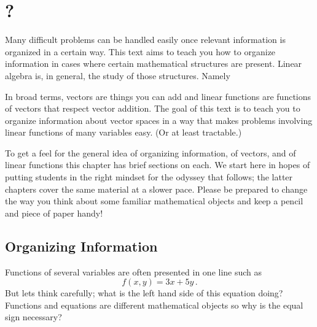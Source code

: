\chapter{\whatIsTitle?}\label{warmup}


Many difficult problems can be handled easily 
once  relevant information is organized in a certain way. 
This text aims to teach you how to organize information in cases where certain mathematical structures are present. 
Linear algebra is, in general, the study of those structures. Namely

\vspace{3mm}
\vspace{3mm}

\noindent In broad terms, vectors are things you can add and  linear functions are %
functions of vectors that respect vector addition. 
The goal of this text is to teach you to organize information about vector spaces in a way that makes problems involving linear functions of many variables easy. 
(Or at least tractable.) 

To get a feel for the general idea of organizing information, of vectors, and of linear functions this chapter has brief sections on each. 
We start here in hopes of putting students in the right mindset for the 
odyssey that follows; the latter chapters cover the same material at a slower pace.  
Please be prepared to change the way you think about some familiar mathematical objects
and keep a pencil and piece of paper handy!

\section{Organizing Information}
\label{organize}
Functions of several variables are often presented in one line such as 
\[f(x,y)=3x+5y\,.\]
But lets think carefully; what is the left hand side of this equation doing? 
Functions and equations are different mathematical objects so why is the equal sign necessary?

